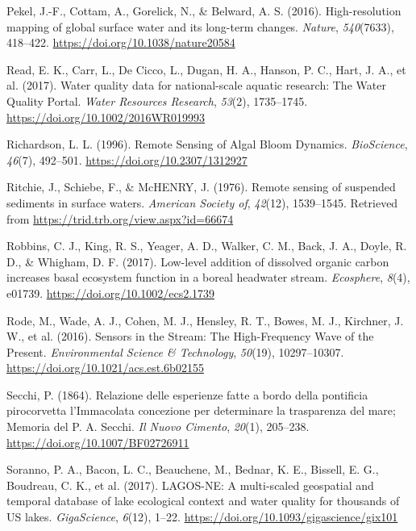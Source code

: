 \documentclass[]{article}
\begin{document}
\leavevmode\hypertarget{ref-Pekel2016}{}%
Pekel, J.-F., Cottam, A., Gorelick, N., \& Belward, A. S. (2016).
High-resolution mapping of global surface water and its long-term
changes. \emph{Nature}, \emph{540}(7633), 418--422.
\url{https://doi.org/10.1038/nature20584}

\leavevmode\hypertarget{ref-Read2017}{}%
Read, E. K., Carr, L., De Cicco, L., Dugan, H. A., Hanson, P. C., Hart,
J. A., et al. (2017). Water quality data for national-scale aquatic
research: The Water Quality Portal. \emph{Water Resources Research},
\emph{53}(2), 1735--1745. \url{https://doi.org/10.1002/2016WR019993}

\leavevmode\hypertarget{ref-Richardson1996}{}%
Richardson, L. L. (1996). Remote Sensing of Algal Bloom Dynamics.
\emph{BioScience}, \emph{46}(7), 492--501.
\url{https://doi.org/10.2307/1312927}

\leavevmode\hypertarget{ref-Ritchie1976}{}%
Ritchie, J., Schiebe, F., \& McHENRY, J. (1976). Remote sensing of
suspended sediments in surface waters. \emph{American Society of},
\emph{42}(12), 1539--1545. Retrieved from
\url{https://trid.trb.org/view.aspx?id=66674}

\leavevmode\hypertarget{ref-Robbins2017}{}%
Robbins, C. J., King, R. S., Yeager, A. D., Walker, C. M., Back, J. A.,
Doyle, R. D., \& Whigham, D. F. (2017). Low-level addition of dissolved
organic carbon increases basal ecosystem function in a boreal headwater
stream. \emph{Ecosphere}, \emph{8}(4), e01739.
\url{https://doi.org/10.1002/ecs2.1739}

\leavevmode\hypertarget{ref-Rode2016}{}%
Rode, M., Wade, A. J., Cohen, M. J., Hensley, R. T., Bowes, M. J.,
Kirchner, J. W., et al. (2016). Sensors in the Stream: The
High-Frequency Wave of the Present. \emph{Environmental Science \&
Technology}, \emph{50}(19), 10297--10307.
\url{https://doi.org/10.1021/acs.est.6b02155}

\leavevmode\hypertarget{ref-Secchi1864}{}%
Secchi, P. (1864). Relazione delle esperienze fatte a bordo della
pontificia pirocorvetta l'Immacolata concezione per determinare la
trasparenza del mare; Memoria del P. A. Secchi. \emph{Il Nuovo Cimento},
\emph{20}(1), 205--238. \url{https://doi.org/10.1007/BF02726911}

\leavevmode\hypertarget{ref-Soranno2017}{}%
Soranno, P. A., Bacon, L. C., Beauchene, M., Bednar, K. E., Bissell, E.
G., Boudreau, C. K., et al. (2017). LAGOS-NE: A multi-scaled geospatial
and temporal database of lake ecological context and water quality for
thousands of US lakes. \emph{GigaScience}, \emph{6}(12), 1--22.
\url{https://doi.org/10.1093/gigascience/gix101}
\end{document}

